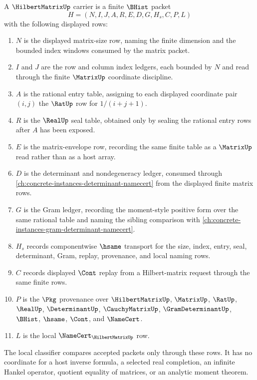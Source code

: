 \begin{definition}
\label{def:hilbert-matrix-carrier}
A $\HilbertMatrixUp$ carrier is a finite $\BHist$ packet
$$
H=(N,I,J,A,R,E,D,G,H_s,C,P,L)
$$
with the following displayed rows:
\begin{enumerate}
\item $N$ is the displayed matrix-size row, naming the finite dimension and the bounded index windows consumed by the matrix packet.
\item $I$ and $J$ are the row and column index ledgers, each bounded by $N$ and read through the finite $\MatrixUp$ coordinate discipline.
\item $A$ is the rational entry table, assigning to each displayed coordinate pair $(i,j)$ the $\RatUp$ row for $1/(i+j+1)$.
\item $R$ is the $\RealUp$ seal table, obtained only by sealing the rational entry rows after $A$ has been exposed.
\item $E$ is the matrix-envelope row, recording the same finite table as a $\MatrixUp$ read rather than as a host array.
\item $D$ is the determinant and nondegeneracy ledger, consumed through \autoref{ch:concrete-instances-determinant-namecert} from the displayed finite matrix rows.
\item $G$ is the Gram ledger, recording the moment-style positive form over the same rational table and naming the sibling comparison with \autoref{ch:concrete-instances-gram-determinant-namecert}.
\item $H_s$ records componentwise $\hsame$ transport for the size, index, entry, seal, determinant, Gram, replay, provenance, and local naming rows.
\item $C$ records displayed $\Cont$ replay from a Hilbert-matrix request through the same finite rows.
\item $P$ is the $\Pkg$ provenance over $\HilbertMatrixUp$, $\MatrixUp$, $\RatUp$, $\RealUp$, $\DeterminantUp$, $\CauchyMatrixUp$, $\GramDeterminantUp$, $\BHist$, $\hsame$, $\Cont$, and $\NameCert$.
\item $L$ is the local $\NameCert_{\HilbertMatrixUp}$ row.
\end{enumerate}
The local classifier compares accepted packets only through these rows. It has no coordinate for a host inverse formula, a selected real completion, an infinite Hankel operator, quotient equality of matrices, or an analytic moment theorem.
\end{definition}

